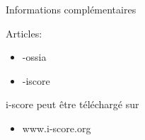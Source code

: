 \begin{block}{Informations complémentaires}
      \small{Articles:
      \begin{itemize}
        \item -ossia
        \item -iscore
      \end{itemize}
      \vspace{0.1in}\noindent i-score peut être téléchargé sur
      \begin{itemize}
        \item www.i-score.org
      \end{itemize}}
    \end{block}